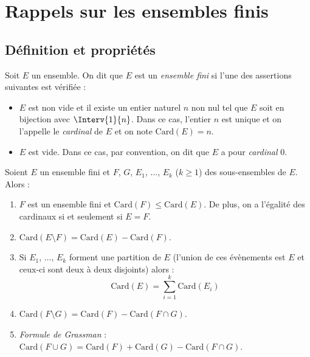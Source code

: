 \documentclass[a4paper,10pt]{report}
\begin{document}

\section{Rappels sur les ensembles finis}
\subsection{Définition et propriétés}

\begin{defip} Soit $E$ un ensemble. On dit que $E$ est un \textit{ensemble fini} si l'une des assertions suivantes est vérifiée :
\begin{itemize}
\item $E$ est non vide et il existe un entier naturel $n$ non nul tel que $E$ soit en bijection avec $\Interv{1}{n}$. Dans ce cas, l'entier $n$ est unique et on l'appelle le \textit{cardinal} de $E$ et on note $\textrm{Card}(E)=n$.
\item $E$ est vide. Dans ce cas, par convention, on dit que $E$ a pour \textit{cardinal} $0$.
\end{itemize}
\end{defip}

\begin{prop} Soient $E$ un ensemble fini et $F$, $G$, $E_1$, $\ldots$, $E_k$ ($k \geq 1$) des sous-ensembles de $E$. Alors :
\begin{enumerate}
\item $F$ est un ensemble fini et $\textrm{Card}(F) \leq \textrm{Card}(E) $. De plus, on a l'égalité des cardinaux si et seulement si $E=F$.
\item $\textrm{Card}(E \setminus F)= \textrm{Card}(E) - \textrm{Card}(F)$.
\item Si $E_1$, $\ldots$, $E_k$ forment une partition de $E$ (l'union de ces évènements est $E$ et ceux-ci sont deux à deux disjoints) alors :
$$ \textrm{Card}(E) = \sum_{i=1}^k \textrm{Card}(E_i) $$
\item $\textrm{Card}(F \setminus G) = \textrm{Card}(F) - \textrm{Card}(F \cap G)$.
\item \textit{Formule de Grassman} : $\textrm{Card}(F \cup G) = \textrm{Card}(F) + \textrm{Card}(G) - \textrm{Card}(F \cap G)$.
\end{enumerate}
\end{prop}
\end{document}
